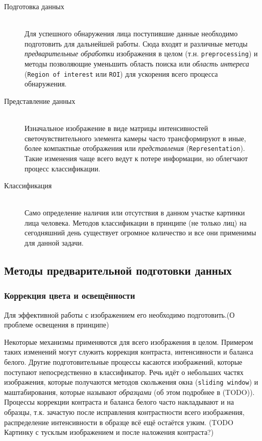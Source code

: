 \documentclass[12pt]{report}
\begin{document}
\begin{description}

\item[Подготовка данных]\hfill \\
	Для успешного обнаружения лица поступившие данные необходимо подготовить для дальнейшей работы. Сюда входят и различные методы \emph{предварительные обработки} изображения в целом (т.н. \texttt{preprocessing}) и методы позволяющие уменьшить область поиска или \emph{область интереса} (\texttt{Region of interest} или \texttt{ROI}) для ускорения всего процесса обнаружения.
\item[Представление данных]\hfill \\ 
	Изначальное изображение в виде матрицы интенсивностей светочувствительного элемента камеры часто трансформируют в иные, более компактные отображения или \emph{представления} (\texttt{Representation}). Такие изменения чаще всего ведут к потере информации, но облегчают процесс классификации.
\item[Классификация]\hfill \\ 
	Само определение наличия или отсутствия в данном участке картинки лица человека. Методов классификации в принципе (не только лиц) на сегодняшний день существует огромное количество и все они применимы для данной задачи.
\end{description}

\subsection{Методы предварительной подготовки данных}
\subsubsection{Коррекция цвета и освещённости}
Для эффективной работы с изображением его необходимо подготовить.(О проблеме освещения в принципе)

Некоторые механизмы применяются для всего изображения в целом. Примером таких изменений могут служить коррекция контраста, интенсивности и баланса белого. Другие подготовительные процессы касаются изображений, которые поступают непосредственно в классификатор. Речь идёт о небольших частях изображения, которые получаются методов скольжения окна (\texttt{sliding window}) и маштабирования, которые называют \emph{образцами} (об этом подробнее в (TODO)). Процессы коррекции контраста и баланса белого часто накладывают и на образцы, т.к. зачастую после исправления контрастности всего изображения, распределение интенсивности в образце всё ещё остаётся узким.
(TODO Картинку с тусклым изображением и после наложения контраста?)
\end{document}
